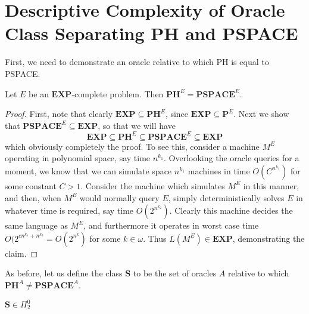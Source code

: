 \section{Descriptive Complexity of Oracle Class Separating PH and PSPACE}
First, we need to demonstrate an oracle relative to which PH is equal to PSPACE. 
\begin{lemma}
	Let $E$ be an $\bm{EXP}$-complete problem. Then $\bm{PH}^E = \bm{PSPACE}^E$. 
\end{lemma}
\begin{proof}
	First, note that clearly $\bm{EXP} \subseteq \bm{PH}^E$, since $\bm{EXP} \subseteq \bm{P}^E$. Next we show that $\bm{PSPACE}^E \subseteq \bm{EXP}$, so that we will have
	\[ \bm{EXP} \subseteq \bm{PH}^E \subseteq \bm{PSPACE}^E \subseteq \bm{EXP} \]
which obviously completely the proof. To see this, consider a machine $M^E$ operating in polynomial space, say time $n^{k_1}$. Overlooking the oracle queries for a moment, we know that we can simulate space $n^{k_1}$ machines in time $O(C^{n^{k_1}})$ for some constant $C > 1$. Consider the machine which simulates $M^E$ in this manner, and then, when $M^E$ would normally query $E$, simply deterministically solves $E$ in whatever time is required, say time $O(2^{n^{k_2}})$. Clearly this machine decides the same language as $M^E$, and furthermore it operates in worst case time $O(2^{cn^{k_1}+n^{k_2}} = O(2^{n^k})$ for some $k \in \omega$. Thus $L(M^E) \in \bm{EXP}$, demonstrating the claim.
\end{proof}
As before, let us define the class $\bm{S}$ to be the set of oracles $A$ relative to which $\bm{PH}^A \neq \bm{PSPACE}^A$. 
\begin{lemma}
	$\bm{S} \in \Pi^0_2$
\end{lemma}
